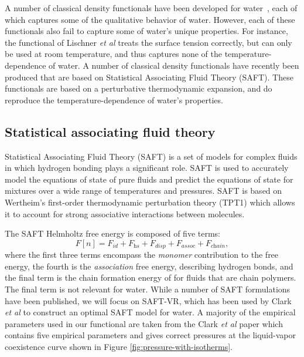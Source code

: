 \documentclass[letterpaper,twocolumn,amsmath,amssymb,prb]{revtex4-1}
\begin{document}
A number of classical density functionals have been developed for
water~\cite{ding1987, Yang1992, yang1994density, gloor2002saft,gloor2004accurate,
  gloor2007prediction, Jaqaman2004, clark2006developing,
  lischner2010classical, fu2005vapor-liquid-dft,
  blas2001examination}, each of which
captures some of the qualitative behavior of water.  However, each of
these functionals also fail to capture some of water's unique
properties.  For instance, the functional of Lischner \emph{et
  al}\cite{lischner2010classical} treats the surface tension
correctly, but can only be used at room temperature, and thus captures
none of the temperature-dependence of water.  A number of classical
density functionals have recently been produced that are based on
Statistical Associating Fluid Theory (SAFT)\cite{ 
  yu2002fmt-dft-inhomogeneous-associating,
  fu2005vapor-liquid-dft,gloor2002saft,
  clark2006developing, gloor2007prediction, gloor2004accurate,
  gross2009density, kahl2008modified, blas2001examination}.  These
functionals are based on a perturbative thermodynamic expansion, and
do reproduce the temperature-dependence of water's properties.

\subsection{Statistical associating fluid theory}

Statistical Associating Fluid Theory (SAFT) is a set of models for
complex fluids in which hydrogen bonding plays a significant
role\cite{muller2001molecular}.  SAFT is used to accurately model the
equations of state of pure fluids and predict the equations of state
for mixtures over a wide range of temperatures and pressures.  SAFT is
based on Wertheim's first-order thermodynamic perturbation theory
(TPT1) \cite{wertheim1984fluidsI, wertheim1984fluidsII,
  wertheim1986fluidsIII, wertheim1986fluidsIV} which allows it to
account for strong associative interactions between molecules.

The SAFT Helmholtz free energy is composed of five terms:
\begin{equation} \label{eq:SAFT-free-energy}
  F[n] = F_\textit{id} + F_\textit{hs} + F_\textit{disp} +
  F_\textit{assoc} + F_\textit{chain},
\end{equation}
where the first three terms encompass the \emph{monomer} contribution
to the free energy, the fourth is the \emph{association} free energy,
describing hydrogen bonds, and the final term is the chain formation
energy of for fluids that are chain polymers.  The final term is not
relevant for water.  While a number of SAFT formulations have been
published, we will focus on SAFT-VR\cite{gil-villegas-1997-SAFT-VR},
which has been used by Clark \emph{et al} to construct an optimal SAFT
model for water\cite{clark2006developing}. A majority of the empirical
parameters used in our functional are taken from the Clark \emph{et al}
paper which contains five empirical parameters and gives
correct pressures at the liquid-vapor coexistence curve shown in Figure
\ref{fig:pressure-with-isotherms}.
\end{document}
